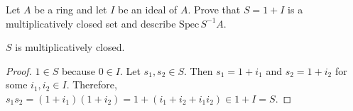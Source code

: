 \begin{problem}
Let $A$ be a ring and let $I$ be an ideal of $A$.
Prove that $S = 1 + I$ is a multiplicatively closed set and describe $\text{Spec}\,S^{-1}A$.
\begin{sol}
    \begin{claim}
        $S$ is multiplicatively closed.
        \begin{proof}
            $1 \in S$ because $0 \in I$.
            Let $s_1, s_2 \in S$.
            Then $s_1 = 1 + i_1$ and $s_2 = 1 + i_2$ for some $i_1, i_2 \in I$.
            Therefore, $s_1s_2 = (1 + i_1)(1 + i_2) = 1 + (i_1 + i_2 + i_1i_2) \in 1 + I = S$.
        \end{proof}
    \end{claim}

    \begin{claim}


    \end{claim}
\end{sol}
\end{problem}